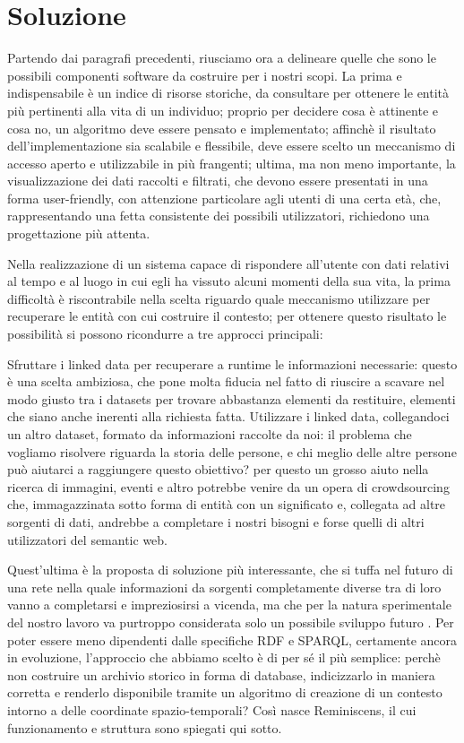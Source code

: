 \documentclass[sigproc-sp.tex]{subfiles}
\begin{document}
\section{Soluzione}
Partendo dai paragrafi precedenti, riusciamo ora a delineare quelle che sono le possibili componenti software da costruire per i nostri scopi. La prima e indispensabile è un indice di risorse storiche, da consultare per ottenere le entità più pertinenti alla vita di un individuo; proprio per decidere cosa è attinente e cosa no, un algoritmo deve essere pensato e implementato; affinchè il risultato dell’implementazione sia scalabile e flessibile, deve essere scelto un meccanismo di accesso aperto e utilizzabile in più frangenti; ultima, ma non meno importante, la visualizzazione dei dati raccolti e filtrati, che devono essere presentati in una forma user-friendly, con attenzione particolare agli utenti di una certa età, che, rappresentando una fetta consistente dei possibili utilizzatori, richiedono una progettazione più attenta.

 Nella realizzazione di un sistema capace di rispondere all’utente con dati relativi al tempo e al luogo in cui egli ha vissuto alcuni momenti della sua vita, la prima difficoltà è riscontrabile nella scelta riguardo quale meccanismo utilizzare per recuperare le entità con cui costruire il contesto; per ottenere questo risultato le possibilità si possono ricondurre a tre approcci principali:

Sfruttare i linked data per recuperare a runtime le informazioni necessarie: questo è una scelta ambiziosa, che pone molta fiducia nel fatto di riuscire a scavare nel modo giusto tra i datasets per trovare abbastanza elementi da restituire, elementi che siano anche inerenti alla richiesta fatta.
Utilizzare i linked data, collegandoci un altro dataset, formato da informazioni raccolte da noi: il problema che vogliamo risolvere riguarda la storia delle persone, e chi meglio delle altre persone può aiutarci a raggiungere questo obiettivo? per questo un grosso aiuto nella ricerca di immagini, eventi e altro potrebbe venire da un opera di crowdsourcing che, immagazzinata sotto forma di entità con un significato e, collegata ad altre sorgenti di dati, andrebbe a completare i nostri bisogni e forse quelli di altri utilizzatori del semantic web.

Quest’ultima è la proposta di soluzione più interessante, che si tuffa nel futuro di una rete nella quale informazioni da sorgenti completamente diverse tra di loro vanno a completarsi e impreziosirsi a vicenda, ma che per la natura sperimentale del nostro lavoro va purtroppo considerata solo un possibile sviluppo futuro .
Per poter essere meno dipendenti dalle specifiche RDF e SPARQL, certamente ancora in evoluzione, l’approccio che abbiamo scelto è di per sé il più semplice: perchè non costruire un archivio storico in forma di database, indicizzarlo in maniera corretta e renderlo disponibile tramite un algoritmo di creazione di un contesto intorno a delle coordinate spazio-temporali? Così nasce Reminiscens, il cui funzionamento e struttura sono spiegati qui sotto.
\end{document}
